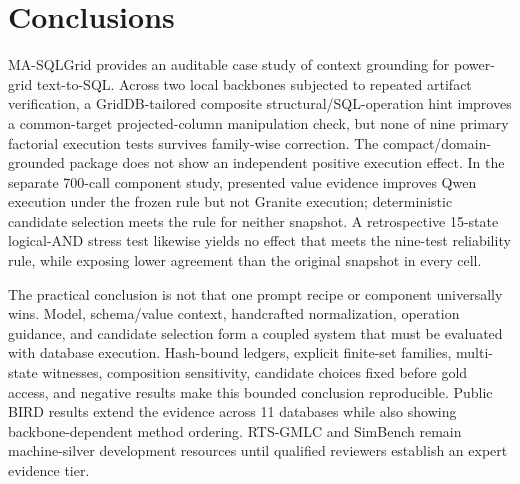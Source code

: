 \documentclass[applsci,article,submit,moreauthors]{Definitions/mdpi}
\newcommand{\masql}{MA-SQLGrid}
\begin{document}
\section{Conclusions}
\masql{} provides an auditable case study of context grounding for power-grid text-to-SQL. Across two local backbones subjected to repeated artifact verification, a GridDB-tailored composite structural/SQL-operation hint improves a common-target projected-column manipulation check, but none of nine primary factorial execution tests survives family-wise correction. The compact/domain-grounded package does not show an independent positive execution effect. In the separate 700-call component study, presented value evidence improves Qwen execution under the frozen rule but not Granite execution; deterministic candidate selection meets the rule for neither snapshot. A retrospective 15-state logical-AND stress test likewise yields no effect that meets the nine-test reliability rule, while exposing lower agreement than the original snapshot in every cell.

The practical conclusion is not that one prompt recipe or component universally wins. Model, schema/value context, handcrafted normalization, operation guidance, and candidate selection form a coupled system that must be evaluated with database execution. Hash-bound ledgers, explicit finite-set families, multi-state witnesses, composition sensitivity, candidate choices fixed before gold access, and negative results make this bounded conclusion reproducible. Public BIRD results extend the evidence across 11 databases while also showing backbone-dependent method ordering. RTS-GMLC and SimBench remain machine-silver development resources until qualified reviewers establish an expert evidence tier.
\end{document}

